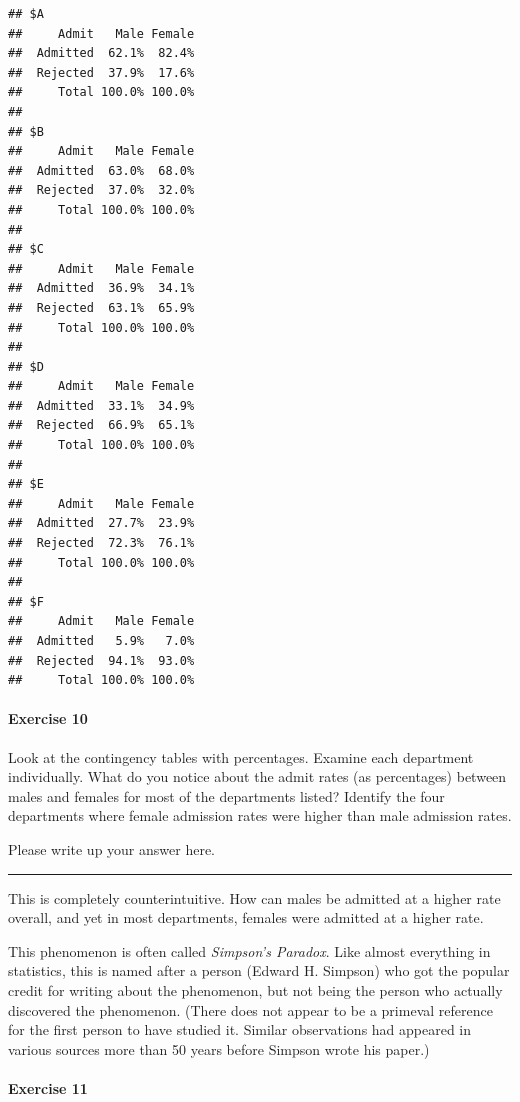 \documentclass[
]{book}
\begin{document}
\begin{verbatim}
## $A
##     Admit   Male Female
##  Admitted  62.1%  82.4%
##  Rejected  37.9%  17.6%
##     Total 100.0% 100.0%
## 
## $B
##     Admit   Male Female
##  Admitted  63.0%  68.0%
##  Rejected  37.0%  32.0%
##     Total 100.0% 100.0%
## 
## $C
##     Admit   Male Female
##  Admitted  36.9%  34.1%
##  Rejected  63.1%  65.9%
##     Total 100.0% 100.0%
## 
## $D
##     Admit   Male Female
##  Admitted  33.1%  34.9%
##  Rejected  66.9%  65.1%
##     Total 100.0% 100.0%
## 
## $E
##     Admit   Male Female
##  Admitted  27.7%  23.9%
##  Rejected  72.3%  76.1%
##     Total 100.0% 100.0%
## 
## $F
##     Admit   Male Female
##  Admitted   5.9%   7.0%
##  Rejected  94.1%  93.0%
##     Total 100.0% 100.0%
\end{verbatim}

\hypertarget{exercise-10-4}{%
\paragraph*{Exercise 10}\label{exercise-10-4}}

Look at the contingency tables with percentages. Examine each department individually. What do you notice about the admit rates (as percentages) between males and females for most of the departments listed? Identify the four departments where female admission rates were higher than male admission rates.

Please write up your answer here.

\begin{center}\rule{0.5\linewidth}{0.5pt}\end{center}

This is completely counterintuitive. How can males be admitted at a higher rate overall, and yet in most departments, females were admitted at a higher rate.

This phenomenon is often called \emph{Simpson's Paradox}. Like almost everything in statistics, this is named after a person (Edward H. Simpson) who got the popular credit for writing about the phenomenon, but not being the person who actually discovered the phenomenon. (There does not appear to be a primeval reference for the first person to have studied it. Similar observations had appeared in various sources more than 50 years before Simpson wrote his paper.)

\hypertarget{exercise-11-4}{%
\paragraph*{Exercise 11}\label{exercise-11-4}}
\end{document}
